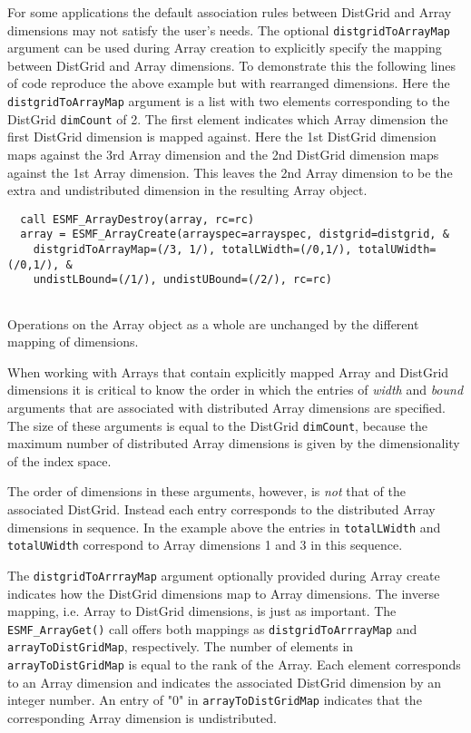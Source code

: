    For some applications the default association rules between DistGrid and Array
   dimensions may not satisfy the user's needs. The optional {\tt distgridToArrayMap} 
   argument can be used during Array creation to explicitly specify the mapping 
   between DistGrid and Array dimensions. To demonstrate this the following lines
   of code reproduce the above example but with rearranged dimensions. Here the
   {\tt distgridToArrayMap} argument is a list with two elements corresponding to
   the DistGrid {\tt dimCount} of 2. The first element indicates which Array
   dimension the first DistGrid dimension is mapped against. Here the
   1st DistGrid dimension maps against the 3rd Array dimension and the 2nd 
   DistGrid dimension maps against the 1st Array dimension. This leaves the 2nd
   Array dimension to be the extra and undistributed dimension in the resulting
   Array object. 

 \begin{verbatim}
  call ESMF_ArrayDestroy(array, rc=rc)
  array = ESMF_ArrayCreate(arrayspec=arrayspec, distgrid=distgrid, &
    distgridToArrayMap=(/3, 1/), totalLWidth=(/0,1/), totalUWidth=(/0,1/), &
    undistLBound=(/1/), undistUBound=(/2/), rc=rc)
 
\end{verbatim}
 

   Operations on the Array object as a whole are unchanged by the different
   mapping of dimensions.
  
   When working with Arrays that contain explicitly mapped Array and DistGrid 
   dimensions it is critical to know the order in which the entries of
   {\em width} and {\em bound} arguments that are associated with distributed
   Array dimensions are specified. The size of these arguments is equal to the
   DistGrid {\tt dimCount}, because the maximum number of distributed Array
   dimensions is given by the dimensionality of the index space.
  
   The order of dimensions in these arguments, however, is {\em not} that of
   the associated DistGrid. Instead each entry corresponds to the distributed
   Array dimensions in sequence. In the example above the entries in 
   {\tt totalLWidth} and {\tt totalUWidth} correspond to Array dimensions 1 and
   3 in this sequence. 
  
   The {\tt distgridToArrrayMap} argument optionally provided during Array create
   indicates how the DistGrid dimensions map to Array dimensions. The inverse
   mapping, i.e. Array to DistGrid dimensions, is just as important. The 
   {\tt ESMF\_ArrayGet()} call offers both mappings as {\tt distgridToArrrayMap}
   and {\tt arrayToDistGridMap}, respectively. The number of elements in 
   {\tt arrayToDistGridMap} is equal to the rank of the Array. Each element
   corresponds to an Array dimension and indicates the associated DistGrid
   dimension by an integer number. An entry of "0" in {\tt arrayToDistGridMap}
   indicates that the corresponding Array dimension is undistributed.
  
